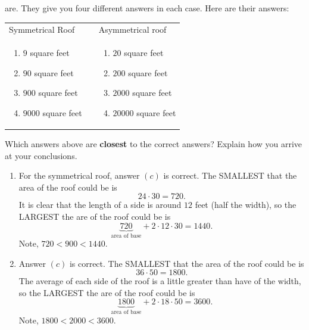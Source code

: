 \documentclass[handout,nooutcomes,noauthor,hints]{ximera}
\begin{document}
\begin{question}
  are. They give you four different answers in each case. Here are
  their answers:
  \begin{center}
    \begin{tabular}{lll}
      Symmetrical Roof &\hspace{1in} & Asymmetrical roof\\
    \begin{minipage}{2in}\begin{enumerate}
    \item $9$ square feet
    \item $90$ square feet
    \item $900$ square feet
    \item $9000$ square feet
    \end{enumerate} 
    \end{minipage}
    & &
    \begin{minipage}{2in} \begin{enumerate}
    \item $20$ square feet
    \item $200$ square feet
    \item $2000$ square feet
    \item $20000$ square feet
      \end{enumerate}
    \end{minipage}
    \end{tabular}
  \end{center}
  Which answers above are \textbf{closest} to the correct answers?
  Explain how you arrive at your conclusions.
  \begin{freeResponse}
    \begin{enumerate}
    \item For the symmetrical roof, answer $(c)$ is correct. The
      SMALLEST that the area of the roof could be is
      \[
      24\cdot 30 = 720.
      \]
      It is clear that the length of a side is around $12$ feet (half the width), so
      the LARGEST the are of the roof could be is
      \[
      \underbrace{720}_{\text{area of base}} + 2\cdot 12\cdot 30 = 1440.
      \]
      Note, $720 < 900 < 1440$.
    \item Answer $(c)$ is correct.  The SMALLEST that the area of the
      roof could be is
      \[
      36\cdot 50 = 1800.
      \]
      The average of each side of the roof is a little greater than
      have of the width, so the LARGEST the are of the roof could be
      is
      \[
      \underbrace{1800}_{\text{area of base}} + 2\cdot 18\cdot 50 = 3600.
      \]
      Note, $1800 < 2000 < 3600$.
    \end{enumerate}
  \end{freeResponse}
\end{question}
\mynewpage
\end{document}
